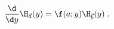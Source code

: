 \begin{equation}
\frac{\d}{\d y} \H_{\vec{a}}(y) = \f(a;y) \H_{\vec{b}}(y) \; .
\label{eq:derive}
\end{equation}

